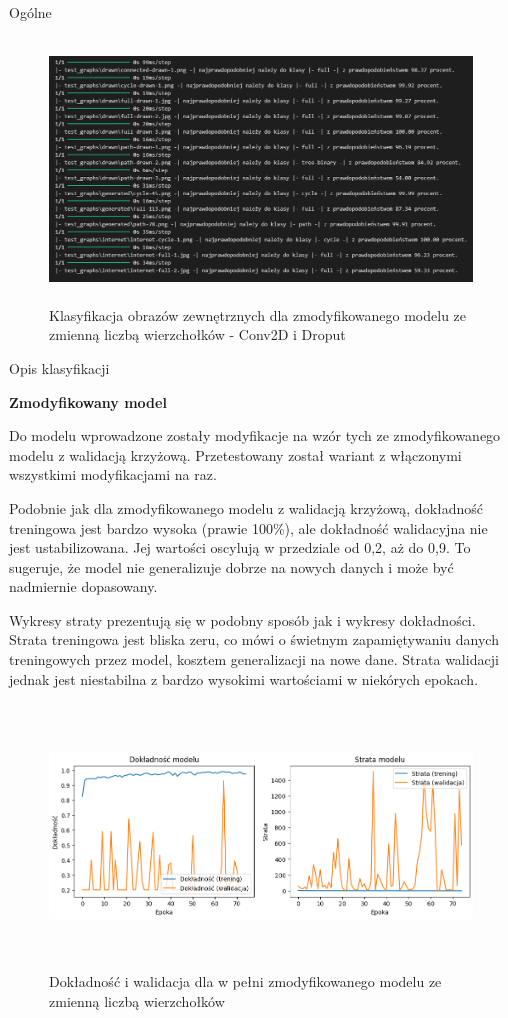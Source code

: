 Ogólne %

\begin{figure}[ht]
	\centering
	\includegraphics[height=7cm]{resources/tests/images/v4/multiple_edges_1_txt.png}
	\caption{Klasyfikacja obrazów zewnętrznych dla zmodyfikowanego modelu ze zmienną liczbą wierzchołków - Conv2D i Droput}
	\label{Fig:tests-var-1b}
\end{figure}
\FloatBarrier

Opis klasyfikacji %

\textbf{Zmodyfikowany model}

Do modelu wprowadzone zostały modyfikacje na wzór tych ze zmodyfikowanego modelu z walidacją krzyżową.
Przetestowany został wariant z włączonymi wszystkimi modyfikacjami na raz.

Podobnie jak dla zmodyfikowanego modelu z walidacją krzyżową, dokładność treningowa jest bardzo wysoka (prawie 100\%),
ale dokładność walidacyjna nie jest ustabilizowana. Jej wartości oscylują w przedziale od 0,2, aż do 0,9.
To sugeruje, że model nie generalizuje dobrze na nowych danych i może być nadmiernie dopasowany.

Wykresy straty prezentują się w podobny sposób jak i wykresy dokładności.
Strata treningowa jest bliska zeru, co mówi o świetnym zapamiętywaniu danych treningowych przez model, kosztem generalizacji na nowe dane.
Strata walidacji jednak jest niestabilna z bardzo wysokimi wartościami w niekórych epokach.

\begin{figure}[ht]
	\centering
	\includegraphics[height=7cm]{resources/tests/images/v4/multiple_edges_img.png}
	\caption{Dokładność i walidacja dla w pełni zmodyfikowanego modelu ze zmienną liczbą wierzchołków}
	\label{Fig:tests-var-2a}
\end{figure}
\FloatBarrier

